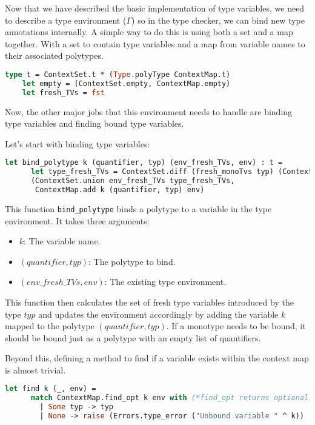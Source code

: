 \documentclass{l4proj}
\begin{document}
Now that we have described the basic implementation of type variables, we need to describe a type environment ($\Gamma$) so in the type checker, we can bind new type annotations internally.
A simple way to do this is using both a set and a map together.
With a set to contain type variables and a map from variable names to their associated polytypes.

\begin{lstlisting}[language=Caml]
    type t = ContextSet.t * (Type.polyType ContextMap.t)
    let empty = (ContextSet.empty, ContextMap.empty)
    let fresh_TVs = fst
\end{lstlisting}

Now, the other major jobs that this environment needs to handle are binding type variables and finding bound type variables.

Let's start with binding type variables:

\begin{lstlisting}[language=Caml]
    let bind_polytype k (quantifier, typ) (env_fresh_TVs, env) : t =
      let type_fresh_TVs = ContextSet.diff (fresh_monoTvs typ) (ContextSet.of_list quantifier) in
      (ContextSet.union env_fresh_TVs type_fresh_TVs,
       ContextMap.add k (quantifier, typ) env)
\end{lstlisting}

This function \texttt{bind\_polytype} binds a polytype to a variable in the type environment.
It takes three arguments:
\begin{itemize}
    \item $k$: The variable name.
    \item $(quantifier, typ)$: The polytype to bind.
    \item $(env\_fresh\_TVs, env)$: The existing type environment.
\end{itemize}

This function then calculates the set of fresh type variables introduced by the type $typ$ and updates the environment accordingly by adding the variable $k$ mapped to the polytype $(quantifier, typ)$.
If a monotype needs to be bound, it should be bound just as a polytype with an empty list of quantifiers.

Beyond this, defining a method to find if a variable exists within the context map is almost trivial.

\begin{lstlisting}[language=Caml]
    let find k (_, env) = 
      match ContextMap.find_opt k env with (*find_opt returns optional type.*)
        | Some typ -> typ 
        | None -> raise (Errors.type_error ("Unbound variable " ^ k))
\end{lstlisting}
\end{document}
